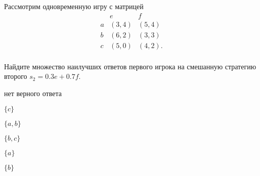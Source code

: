 
\begin{question}
Рассмотрим одновременную игру с матрицей
\[
\begin{matrix}
   & e & f \\
a  & (3, 4) & (5, 4) \\
b  & (6, 2) & (3, 3) \\ 
c  & (5, 0) & (4, 2). \\ 
\end{matrix}
\]

Найдите множество наилучших ответов первого игрока на смешанную стратегию второго \(s_2 = 0.3e + 0.7f\).
\begin{answerlist}
  \item нет верного ответа
  \item \(\{c\}\)
  \item \(\{a, b\}\)
  \item \(\{b, c\}\)
  \item \(\{a\}\)
  \item \(\{b\}\)
\end{answerlist}
\end{question}


